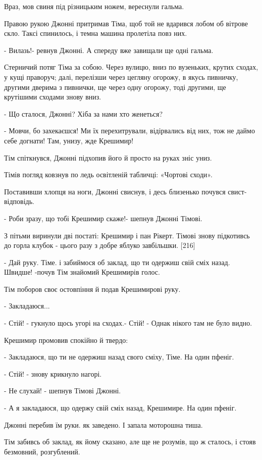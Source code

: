 Враз, мов свиня під різницьким ножем, вереснули гальма.

Правою рукою Джонні притримав Тіма, щоб той не вдарився лобом об вітрове скло. Таксі спинилось, і темна машина пролетіла повз них.

- Вилазь!- ревнув Джонні. А спереду вже завищали ще одні гальма.

Стерничий потяг Тіма за собою. Через вулицю, вниз по вузеньких, крутих сходах, у кущі праворуч; далі, перелізши через цегляну огорожу, в якусь пивничку, другими дверима з пивнички, ще через одну огорожу, тоді другими, ще крутішими сходами знову вниз.

- Що сталося, Джонні? Хіба за нами хто женеться?

- Мовчи, бо захекаєшся! Ми їх перехитрували, відірвались від них, тож не даймо себе догнати! Там, унизу, жде Крешимир!

Тім спіткнувся, Джонні підхопив його й просто на руках зніс униз.

Тімів погляд ковзнув по ледь освітленій табличці: «Чортові сходи».

Поставивши хлопця на ноги, Джонні свиснув, і десь близенько почувся свист-відповідь.

- Роби зразу, що тобі Крешимир скаже!- шепнув Джонні Тімові.

З пітьми виринули дві постаті: Крешимир і пан Рікерт. Тімові знову підкотивсь до горла клубок - цього разу з добре яблуко завбільшки. [216]

- Дай руку. Тіме. і забиймося об заклад, що ти одержиш свій сміх назад. Швидше! -почув Тім знайомий Крешимирів голос.

Тім поборов своє остовпіння й подав Крешимирові руку.

- Закладаюся...

- Стій! - гукнуло щось угорі на сходах.- Стій! - Однак нікого там не було видно.

Крешимир промовив спокійно й твердо:

- Закладаюся, що ти не одержиш назад свого сміху, Тіме. На один пфеніг.

- Стій! - знову крикнуло нагорі.

- Не слухай! - шепнув Тімові Джонні.

- А я закладаюся, що одержу свій сміх назад, Крешимире. На один пфеніг.

Джонні перебив їм руки. як заведено. І запала моторошна тиша.

Тім забивсь об заклад, як йому сказано, але ще не розумів, що ж сталось, і стояв безмовний, розгублений.

